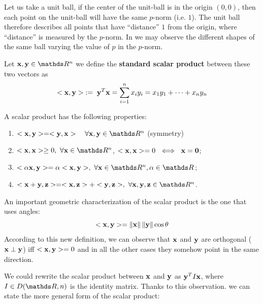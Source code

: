 \documentclass[computationalMathematics.tex]{subfiles}
\begin{document}
Let us take a unit ball, if the center of the unit-ball is in the origin $(0,0)$, then each point on the unit-ball will have the same $p$-norm (i.e. $1$). The unit ball therefore describes all points that have ``distance'' $1$ from the origin, where ``distance'' is measured by the $p$-norm.
In  we may observe the different shapes of the same ball varying the value of $p$ in the $p$-norm.\\


\begin{definition}
  Let $\vect{x}, \vect{y} \in \R^n$ we define the \textbf{standard scalar product} between these two vectors as
  \[
<{\bf x }, {\bf y }> \; := \; {{\bf y }}^{T} {\bf x } = \sum_{i=1}^n x_i y_i = x_1 y_1 + \cdots + x_n y_n
  \]
\end{definition}

\begin{proposition}
A scalar product has the following properties:
\begin{enumerate}
  \item $\ps{\vect{x}}{\vect{y}} = \ps{\vect{y}}{\vect{x}} \quad \forall \vect{x}, \vect{y} \in \R^n$ (symmetry)
  \item $\ps{\vect{x}}{\vect{x}} \ge 0,~\forall \vect{x} \in \R^n$, $<{\bf x }, {\bf x }>=0~\iff~{\bf x }={\bf 0 }$;
  \item $\ps{\alpha \vect{x}}{\vect{y}} = \alpha \ps{\vect{x}}{\vect{y}},~\forall \vect{x}\in\R^n, \alpha \in \R$;
  \item $\ps{\vect{x} + \vect{y}}{\vect{z}} = \ps{\vect{x}}{\vect{z}} + \ps{\vect{y}}{\vect{z}},~\forall \vect{x},\vect{y}, \vect{z} \in \R^n$.
\end{enumerate}
\end{proposition}

\noindent An important geometric characterization of the scalar product is the one that uses angles:
\[
  <{\bf x }, {\bf y }> = \left\lVert{\bf x }\right\rVert \left\lVert{\bf y }\right\rVert \cos \theta
\]
According to this new definition, we can observe that ${\bf x }$ and ${\bf y }$ are orthogonal (${\bf x } \perp {\bf y }$) iff $<{\bf x }, {\bf y }> = 0$ and in all the other cases they somehow point in the same direction.

We could rewrite the scalar product between ${\bf x }$ and ${\bf y }$ as ${{\bf y }}^{T} I {\bf x }$, where $I \in D(\R, n)$ is the identity matrix.
Thanks to this observation. we can state the more general form of the scalar product:
\end{document}
